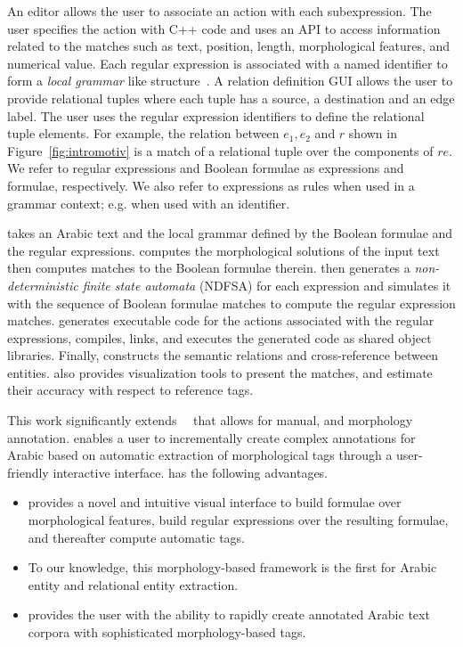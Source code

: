 An editor allows the user to associate an action with each subexpression.
The user specifies the action with C++ code and uses an API to access information 
related to the matches such as text, position, length, morphological features, 
and numerical value.
%
Each regular expression is associated with a named identifier to form a 
{\em local grammar} like structure~\cite{traboulsi2009arabic}. 
%
A relation definition GUI allows the user to provide relational tuples 
where each tuple has a 
source, a destination and an edge label.
The user uses the regular expression identifiers to define the relational 
tuple elements.
For example, the relation between $e_1, e_2$ and $r$ shown in 
Figure~\ref{fig:intromotiv} is a match of a relational tuple 
over the components of $re$. 
%
We refer to regular expressions and Boolean formulae as expressions and formulae, respectively.
We also refer to expressions as rules
when used in a grammar context; e.g.  when used with an identifier. 

\framework takes an Arabic text and the local grammar defined by the 
Boolean formulae and the regular expressions.
\framework computes the morphological solutions of the 
input text then computes matches to the Boolean formulae therein.
\framework then generates a {\em non-deterministic finite state 
automata} (NDFSA) for each expression and simulates it with the 
sequence of Boolean formulae matches to compute the regular 
expression matches. 
\framework generates executable code for the actions associated with
the regular expressions, 
compiles, links, and executes the generated code 
as shared object libraries.
Finally, \framework constructs the semantic relations and 
cross-reference between entities.
\framework also provides visualization tools to present the matches, 
and estimate their accuracy with respect to reference tags.

This work significantly extends~~\citeyear{JaZaMatar}
that allows for manual, and morphology annotation.
\framework enables a user to incrementally create 
complex annotations for Arabic based on automatic 
extraction of morphological tags through a user-friendly interactive interface. 
\framework has the following advantages.
\begin{itemize}
  \item \framework provides a novel and intuitive visual interface to build formulae over morphological features, 
    build regular expressions over the resulting formulae, and thereafter compute automatic tags.
  \item To our knowledge, this morphology-based framework is the first for Arabic entity and relational entity extraction.
  \item \framework provides the user with the ability to rapidly create annotated Arabic text corpora with sophisticated morphology-based tags.
\end{itemize}

